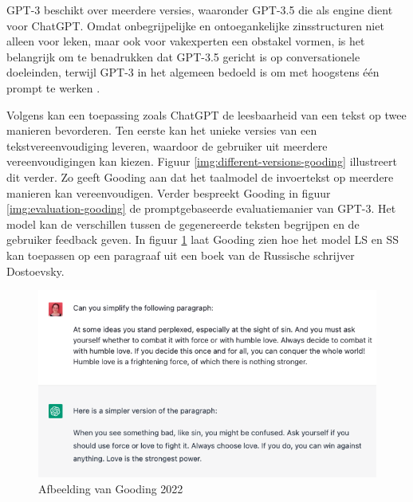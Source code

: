 GPT-3 beschikt over meerdere versies, waaronder GPT-3.5 die als engine dient voor ChatGPT. Omdat onbegrijpelijke en ontoegankelijke zinsstructuren niet alleen voor leken, maar ook voor vakexperten een obstakel vormen, is het belangrijk om te benadrukken dat GPT-3.5 gericht is op conversationele doeleinden, terwijl GPT-3 in het algemeen bedoeld is om met hoogstens één prompt te werken \autocite{McNutt2014, Hubbard2017}.

\medspace

Volgens \textcite{Gooding2022} kan een toepassing zoals ChatGPT de leesbaarheid van een tekst op twee manieren bevorderen. Ten eerste kan het unieke versies van een tekstvereenvoudiging leveren, waardoor de gebruiker uit meerdere vereenvoudigingen kan kiezen. Figuur \ref{img:different-versions-gooding} illustreert dit verder.  Zo geeft Gooding aan dat het taalmodel de invoertekst op meerdere manieren kan vereenvoudigen. Verder bespreekt Gooding in figuur \ref{img:evaluation-gooding} de promptgebaseerde evaluatiemanier van GPT-3. Het model kan de verschillen tussen de gegenereerde teksten begrijpen en de gebruiker feedback geven. In figuur \ref{img:simplification-gooding} laat Gooding zien hoe het model LS en SS kan toepassen op een paragraaf uit een boek van de Russische schrijver Dostoevsky.

\begin{figure}[H]
	\includegraphics[width=\linewidth]{img/chatgpt-example-simplification-gooding.png}
	\caption{Afbeelding van Gooding 2022}
	\label{img:simplification-gooding}
\end{figure}

